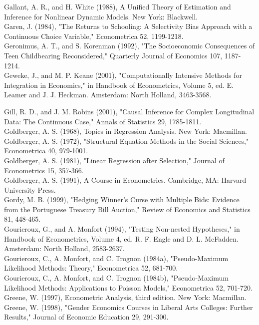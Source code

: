 \documentclass[10pt]{article}
\begin{document}
Gallant, A. R., and H. White (1988), A Unified Theory of Estimation and Inference for Nonlinear Dynamic Models. New York: Blackwell.\\
Garen, J. (1984), "The Returns to Schooling: A Selectivity Bias Approach with a Continuous Choice Variable," Econometrica 52, 1199-1218.\\
Geronimus, A. T., and S. Korenman (1992), "The Socioeconomic Consequences of Teen Childbearing Reconsidered," Quarterly Journal of Economics 107, 1187-1214.\\
Geweke, J., and M. P. Keane (2001), "Computationally Intensive Methods for Integration in Economics," in Handbook of Econometrics, Volume 5, ed. E. Leamer and J. J. Heckman. Amsterdam: North Holland, 3463-3568.

Gill, R. D., and J. M. Robins (2001), "Causal Inference for Complex Longitudinal Data: The Continuous Case," Annals of Statistics 29, 1785-1811.\\
Goldberger, A. S. (1968), Topics in Regression Analysis. New York: Macmillan.\\
Goldberger, A. S. (1972), "Structural Equation Methods in the Social Sciences," Econometrica 40, 979-1001.\\
Goldberger, A. S. (1981), "Linear Regression after Selection," Journal of Econometrics 15, 357-366.\\
Goldberger, A. S. (1991), A Course in Econometrics. Cambridge, MA: Harvard University Press.\\
Gordy, M. B. (1999), "Hedging Winner's Curse with Multiple Bids: Evidence from the Portuguese Treasury Bill Auction," Review of Economics and Statistics 81, 448-465.\\
Gourieroux, G., and A. Monfort (1994), "Testing Non-nested Hypotheses," in Handbook of Econometrics, Volume 4, ed. R. F. Engle and D. L. McFadden. Amsterdam: North Holland, 2583-2637.\\
Gourieroux, C., A. Monfort, and C. Trognon (1984a), "Pseudo-Maximum Likelihood Methods: Theory," Econometrica 52, 681-700.\\
Gourieroux, C., A. Monfort, and C. Trognon (1984b), "Pseudo-Maximum Likelihood Methods: Applications to Poisson Models," Econometrica 52, 701-720.\\
Greene, W. (1997), Econometric Analysis, third edition. New York: Macmillan.\\
Greene, W. (1998), "Gender Economics Courses in Liberal Arts Colleges: Further Results," Journal of Economic Education 29, 291-300.\\
\end{document}
